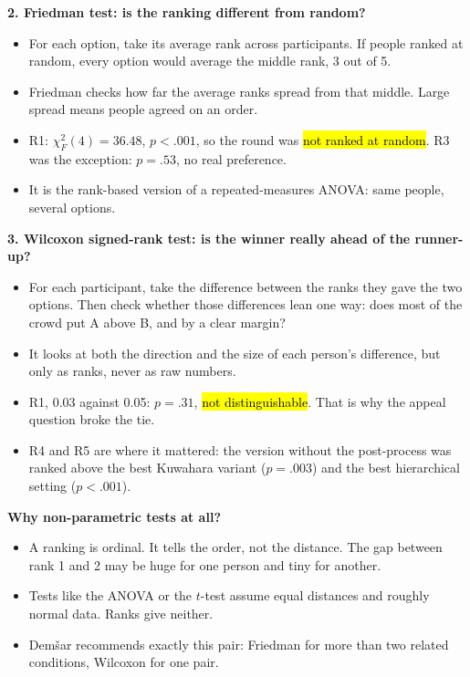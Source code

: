 \documentclass[11pt,a4paper]{article}
\newcommand{\key}[1]{\hl{#1}}
\begin{document}
\textbf{2. Friedman test: is the ranking different from random?}
\begin{itemize}
  \item For each option, take its average rank across participants. If people ranked at random, every option would average the middle rank, 3 out of 5.
  \item Friedman checks how far the average ranks spread from that middle. Large spread means people agreed on an order.
  \item R1: $\chi^2_F(4)=36.48$, $p<.001$, so the round was \key{not ranked at random}. R3 was the exception: $p=.53$, no real preference.
  \item It is the rank-based version of a repeated-measures ANOVA: same people, several options.
\end{itemize}

\textbf{3. Wilcoxon signed-rank test: is the winner really ahead of the runner-up?}
\begin{itemize}
  \item For each participant, take the difference between the ranks they gave the two options. Then check whether those differences lean one way: does most of the crowd put A above B, and by a clear margin?
  \item It looks at both the direction and the size of each person's difference, but only as ranks, never as raw numbers.
  \item R1, 0.03 against 0.05: $p=.31$, \key{not distinguishable}. That is why the appeal question broke the tie.
  \item R4 and R5 are where it mattered: the version without the post-process was ranked above the best Kuwahara variant ($p=.003$) and the best hierarchical setting ($p<.001$).
\end{itemize}

\textbf{Why non-parametric tests at all?}
\begin{itemize}
  \item A ranking is ordinal. It tells the order, not the distance. The gap between rank 1 and 2 may be huge for one person and tiny for another.
  \item Tests like the ANOVA or the $t$-test assume equal distances and roughly normal data. Ranks give neither.
  \item Demšar recommends exactly this pair: Friedman for more than two related conditions, Wilcoxon for one pair.
\end{itemize}
\end{document}
